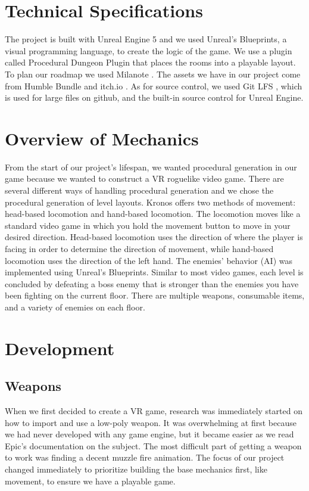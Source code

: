 \documentclass{sigchi}
\begin{document}
\section{Technical Specifications}
The project is built with Unreal Engine 5 \cite{unrealweb} and we used Unreal's Blueprints, a visual programming language, to create the logic of the game. We use a plugin called Procedural Dungeon Plugin \cite{dungeonplugin} that places the rooms into a playable layout. To plan our roadmap we used Milanote \cite{milanote}. The assets we have in our project come from Humble Bundle \cite{humble} and itch.io \cite{itch}. As for source control, we used Git LFS \cite{gitlfs}, which is used for large files on github, and the built-in source control for Unreal Engine.

\section{Overview of Mechanics}
From the start of our project's lifespan, we wanted procedural generation in our game because we wanted to construct a VR roguelike video game. There are several different ways of handling procedural generation and we chose the procedural generation of level layouts. Kronos offers two methods of movement: head-based locomotion and hand-based locomotion. The locomotion moves like a standard video game in which you hold the movement button to move in your desired direction. Head-based locomotion uses the direction of where the player is facing in order to determine the direction of movement, while hand-based locomotion uses the direction of the left hand. The enemies' behavior (AI) was implemented using Unreal's Blueprints. Similar to most video games, each level is concluded by defeating a boss enemy that is stronger than the enemies you have been fighting on the current floor. There are multiple weapons, consumable items, and a variety of enemies on each floor.

\section{Development}
\subsection*{Weapons}
When we first decided to create a VR game, research was immediately started on how to import and use a low-poly weapon. It was overwhelming at first because we had never developed with any game engine, but it became easier as we read Epic's documentation on the subject. The most difficult part of getting a weapon to work was finding a decent muzzle fire animation. The focus of our project changed immediately to prioritize building the base mechanics first, like movement, to ensure we have a playable game.
\end{document}
